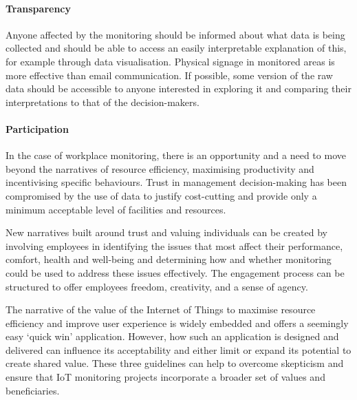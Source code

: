 \paragraph{Transparency} Anyone affected by the monitoring should be
informed about what data is being collected and should be able to
access an easily interpretable explanation of this, for example
through data visualisation. Physical signage in monitored areas is
more effective than email communication. If possible, some version of
the raw data should be accessible to anyone interested in exploring it
and comparing their interpretations to that of the decision-makers. 

\paragraph{Participation} In the case of workplace monitoring, there
is an opportunity and a need to move beyond the narratives of resource
efficiency, maximising productivity and incentivising specific
behaviours. Trust in management decision-making has been compromised
by the use of data to justify cost-cutting and provide only a minimum
acceptable level of facilities and resources. 

New narratives built around trust and valuing individuals can be
created by involving employees in identifying the issues that most
affect their performance, comfort, health and well-being and
determining how and whether monitoring could be used to address these
issues effectively. The engagement process can be structured to offer
employees freedom, creativity, and a sense of agency. 

The narrative of the value of the Internet of Things to maximise
resource efficiency and improve user experience is widely embedded and
offers a seemingly easy ‘quick win’ application. However, how such an
application is designed and delivered can influence its acceptability
and either limit or expand its potential to create shared value. These
three guidelines can help to overcome skepticism and ensure that IoT
monitoring projects incorporate a broader set of values and
beneficiaries. 

